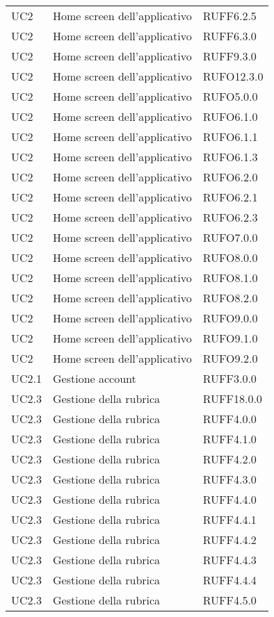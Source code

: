 \begin{longtable}{lp{}l}
UC2 & Home screen dell'applicativo & RUFF6.2.5 \\
UC2 & Home screen dell'applicativo & RUFF6.3.0 \\
UC2 & Home screen dell'applicativo & RUFF9.3.0 \\
UC2 & Home screen dell'applicativo & RUFO12.3.0 \\
UC2 & Home screen dell'applicativo & RUFO5.0.0 \\
UC2 & Home screen dell'applicativo & RUFO6.1.0 \\
UC2 & Home screen dell'applicativo & RUFO6.1.1 \\
UC2 & Home screen dell'applicativo & RUFO6.1.3 \\
UC2 & Home screen dell'applicativo & RUFO6.2.0 \\
UC2 & Home screen dell'applicativo & RUFO6.2.1 \\
UC2 & Home screen dell'applicativo & RUFO6.2.3 \\
UC2 & Home screen dell'applicativo & RUFO7.0.0 \\
UC2 & Home screen dell'applicativo & RUFO8.0.0 \\
UC2 & Home screen dell'applicativo & RUFO8.1.0 \\
UC2 & Home screen dell'applicativo & RUFO8.2.0 \\
UC2 & Home screen dell'applicativo & RUFO9.0.0 \\
UC2 & Home screen dell'applicativo & RUFO9.1.0 \\
UC2 & Home screen dell'applicativo & RUFO9.2.0 \\
UC2.1 & Gestione account & RUFF3.0.0 \\
UC2.3 & Gestione della rubrica & RUFF18.0.0 \\
UC2.3 & Gestione della rubrica & RUFF4.0.0 \\
UC2.3 & Gestione della rubrica & RUFF4.1.0 \\
UC2.3 & Gestione della rubrica & RUFF4.2.0 \\
UC2.3 & Gestione della rubrica & RUFF4.3.0 \\
UC2.3 & Gestione della rubrica & RUFF4.4.0 \\
UC2.3 & Gestione della rubrica & RUFF4.4.1 \\
UC2.3 & Gestione della rubrica & RUFF4.4.2 \\
UC2.3 & Gestione della rubrica & RUFF4.4.3 \\
UC2.3 & Gestione della rubrica & RUFF4.4.4 \\
UC2.3 & Gestione della rubrica & RUFF4.5.0 \\

\end{longtable}
